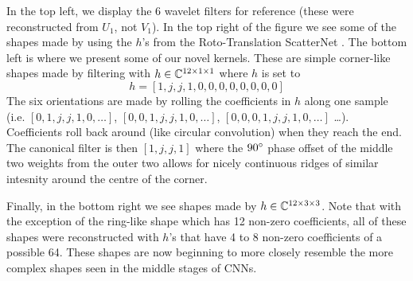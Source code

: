 In the top left, we display the 6 wavelet filters for reference (these were
reconstructed from $U_1$, not $V_1$). In the top right of the figure we see some
of the shapes made by using the $h$'s from the Roto-Translation ScatterNet
\cite{sifre_rotation_2013, oyallon_deep_2015}.  The bottom left is where we
present some of our novel kernels. These are simple corner-like shapes made 
by filtering with ${h\in \complexes[12\x 1\x 1]}$ where $h$ is set to
\begin{equation} \label{eq:ch4:simple_corner}
  h = [1, j, j, 1, 0, 0, 0, 0, 0, 0, 0, 0]
\end{equation}
The six orientations are made by rolling the coefficients in $h$ along one
sample (i.e. $[0, 1, j, j, 1, 0,\ldots]$, $[0,0,1,j,j,1,0,\ldots]$,
$[0,0,0,1,j,j,1,0, \ldots]$ \ldots). Coefficients roll back around (like
circular convolution) when they reach the end. The canonical filter is then $[1,
j, j, 1]$ where the $90\degs$ phase offset of the middle two weights from the
outer two allows for nicely continuous ridges of similar intesnity around the
centre of the corner.

Finally, in the bottom right we see shapes made by 
${h \in \complexes[12\x 3\x 3]}$. Note that with the exception of the 
ring-like shape which has 12 non-zero coefficients, all of these shapes were
reconstructed with $h$'s that have 4 to 8 non-zero coefficients of a possible 
64. These shapes are now beginning to more closely resemble the more complex
shapes seen in the middle stages of CNNs. 

